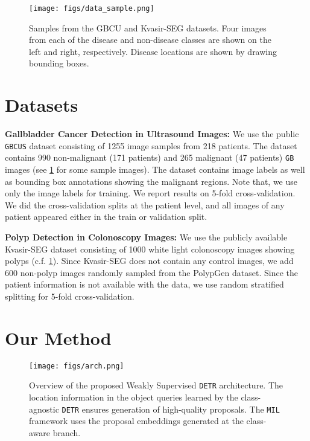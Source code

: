 \documentclass[runningheads]{llncs}
\newcommand{\myfirstpara}[1]{\par \noindent \textbf{#1:}}
\newcommand{\mypara}[1]{ \myfirstpara{#1}}
\def\gbc{\texttt{GBC}\xspace}
\def\gb{\texttt{GB}\xspace}
\def\us{\texttt{US}\xspace}
\def\mil{\texttt{MIL}\xspace}
\def\detr{\texttt{DETR}\xspace}
\begin{document}
%
%
\begin{figure}[t]
    \centering
    \texttt{[image: figs/data\_sample.png]}
    \caption{Samples from the GBCU \cite{basu2022surpassing} and Kvasir-SEG \cite{kvasir} datasets. Four images from each of the disease and non-disease classes are shown on the left and right, respectively. Disease locations are shown by drawing bounding boxes.}
    \label{fig:data_sample}
\end{figure}

\section{Datasets}

\myfirstpara{Gallbladder Cancer Detection in Ultrasound Images}
%
We use the public \gbc \us dataset \cite{basu2022surpassing} consisting of 1255 image samples from 218 patients. The dataset contains 990 non-malignant (171 patients) and 265 malignant (47 patients) \gb images (see \cref{fig:data_sample} for some sample images). The dataset contains image labels as well as bounding box annotations showing the malignant regions. Note that, we use only the image labels for training. We report results on 5-fold cross-validation. We did the cross-validation splits at the patient level, and all images of any patient appeared either in the train or validation split. 

\mypara{Polyp Detection in Colonoscopy Images}
%
We use the publicly available Kvasir-SEG \cite{kvasir} dataset consisting of 1000 white light colonoscopy images showing polyps (c.f. \cref{fig:data_sample}). Since Kvasir-SEG does not contain any control images, we add 600 non-polyp images randomly sampled from the PolypGen \cite{polypgen} dataset. Since the patient information is not available with the data, we use random stratified splitting for 5-fold cross-validation.

%
%
\section{Our Method}

\begin{figure}[t]
    \centering
    \texttt{[image: figs/arch.png]}
    \caption{Overview of the proposed Weakly Supervised \detr architecture. The location information in the object queries learned by the class-agnostic \detr ensures generation of high-quality proposals. The \mil framework uses the proposal embeddings generated at the class-aware branch. }
    \label{fig:method}
\end{figure}
\end{document}

